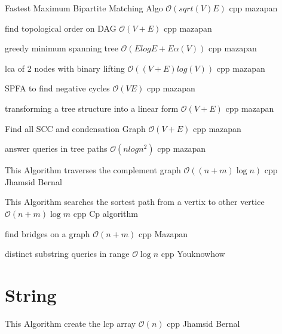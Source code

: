 {Fastest Maximum Bipartite Matching Algo}
{$\mathcal{O}(sqrt(V)E)$}
{cpp}{}
{mazapan}

{find topological order on DAG}
{$\mathcal{O}(V + E)$}
{cpp}{}
{mazapan}

{greedy minimum spanning tree}
{$\mathcal{O}(ElogE+E\alpha(V))$}
{cpp}{}
{mazapan}

{lca of 2 nodes with binary lifting}
{$\mathcal{O}((V + E)log(V))$}
{cpp}{}
{mazapan}

{SPFA to find negative cycles}
{$\mathcal{O}(VE)$}
{cpp}{}
{mazapan}

{transforming a tree structure into a linear form}
{$\mathcal{O}(V + E)$}
{cpp}{}
{mazapan}

{Find all SCC and condensation Graph}
{$\mathcal{O}(V + E)$}
{cpp}{}
{mazapan}

{answer queries in tree paths}
{$\mathcal{O}(nlogn^2)$}
{cpp}{}
{mazapan}

{This Algorithm traverses the complement graph}
{$\mathcal{O}((n + m)\log{n})$}
{cpp}{}
{Jhamsid Bernal}
\progress

{This Algorithm searches the sortest path from a vertix to other vertice}
{$\mathcal{O}(n + m)\log{m}$}
{cpp}{}
{Cp algorithm}

{find bridges on a graph}
{$\mathcal{O}(n + m)$}
{cpp}{}
{Mazapan}

{distinct substring queries in range}
{$\mathcal{O}{\log{n}}$}
{cpp}{}
{Youknowhow}

\section{String}

{This Algorithm create the lcp array}
{$\mathcal{O}(n)$}
{cpp}{}
{Jhamsid Bernal}

